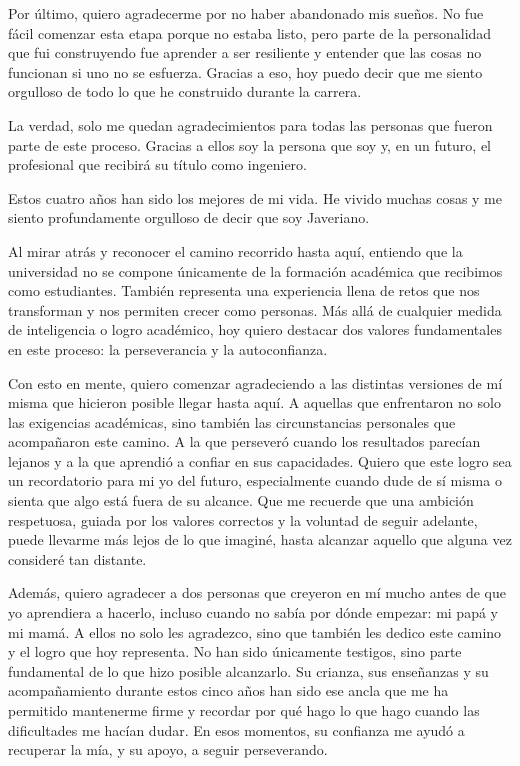 \documentclass[12pt,letterpaper,oneside]{article}
\newcommand{\autorCuatro}{Xiomara Herrera Suárez}
\begin{document}
Por último, quiero agradecerme por no haber abandonado mis sueños. No fue fácil comenzar esta etapa porque no estaba listo, pero parte de la personalidad que fui construyendo fue aprender a ser resiliente y entender que las cosas no funcionan si uno no se esfuerza. Gracias a eso, hoy puedo decir que me siento orgulloso de todo lo que he construido durante la carrera.

La verdad, solo me quedan agradecimientos para todas las personas que fueron parte de este proceso. Gracias a ellos soy la persona que soy y, en un futuro, el profesional que recibirá su título como ingeniero.

Estos cuatro años han sido los mejores de mi vida. He vivido muchas cosas y me siento profundamente orgulloso de decir que soy Javeriano.

\vspace{1cm}
\noindent{\bfseries \autorCuatro:}
\vspace{0.3cm}

Al mirar atrás y reconocer el camino recorrido hasta aquí, entiendo que la universidad no se compone únicamente de la formación académica que recibimos como estudiantes. También representa una experiencia llena de retos que nos transforman y nos permiten crecer como personas. Más allá de cualquier medida de inteligencia o logro académico, hoy quiero destacar dos valores fundamentales en este proceso: la perseverancia y la autoconfianza.

Con esto en mente, quiero comenzar agradeciendo a las distintas versiones de mí misma que hicieron posible llegar hasta aquí. A aquellas que enfrentaron no solo las exigencias académicas, sino también las circunstancias personales que acompañaron este camino. A la que perseveró cuando los resultados parecían lejanos y a la que aprendió a confiar en sus capacidades. Quiero que este logro sea un recordatorio para mi yo del futuro, especialmente cuando dude de sí misma o sienta que algo está fuera de su alcance. Que me recuerde que una ambición respetuosa, guiada por los valores correctos y la voluntad de seguir adelante, puede llevarme más lejos de lo que imaginé, hasta alcanzar aquello que alguna vez consideré tan distante.

Además, quiero agradecer a dos personas que creyeron en mí mucho antes de que yo aprendiera a hacerlo, incluso cuando no sabía por dónde empezar: mi papá y mi mamá. A ellos no solo les agradezco, sino que también les dedico este camino y el logro que hoy representa. No han sido únicamente testigos, sino parte fundamental de lo que hizo posible alcanzarlo. Su crianza, sus enseñanzas y su acompañamiento durante estos cinco años han sido ese ancla que me ha permitido mantenerme firme y recordar por qué hago lo que hago cuando las dificultades me hacían dudar. En esos momentos, su confianza me ayudó a recuperar la mía, y su apoyo, a seguir perseverando.
\end{document}
